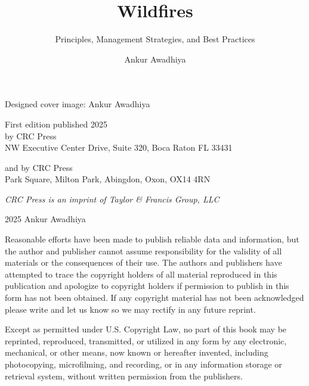 \documentclass[
  12 pt,
]{Nemilov}
\author{}
\date{\vspace{-2.5em}}
\begin{document}


\title{Wildfires}

\subtitle{Principles, Management Strategies, and Best Practices}

\author{Ankur Awadhiya}




\maketitle



\clearpage
\locfont


\noindent Designed cover image: Ankur Awadhiya


\noindent First edition published 2025\\
\noindent by CRC Press\\
 NW Executive Center Drive, Suite 320, Boca Raton FL 33431


\noindent and by CRC Press\\
 Park Square, Milton Park, Abingdon, Oxon, OX14 4RN


\noindent \textit{CRC Press is an imprint of Taylor \& Francis Group, LLC}


\noindent {\copyright} 2025 Ankur Awadhiya


\noindent Reasonable efforts have been made to publish reliable data and information, but the author and publisher cannot assume responsibility for the validity of all materials or the consequences of their use. The authors and publishers have attempted to trace the copyright holders of all material reproduced in this publication and apologize to copyright holders if permission to publish in this form has not been obtained. If any copyright material has not been acknowledged please write and let us know so we may rectify in any future reprint.

\noindent Except as permitted under U.S. Copyright Law, no part of this book may be reprinted, reproduced, transmitted, or utilized in any form by any electronic, mechanical, or other means, now known or hereafter invented, including photocopying, microfilming, and recording, or in any information storage or retrieval system, without written permission from the publishers.
\end{document}
